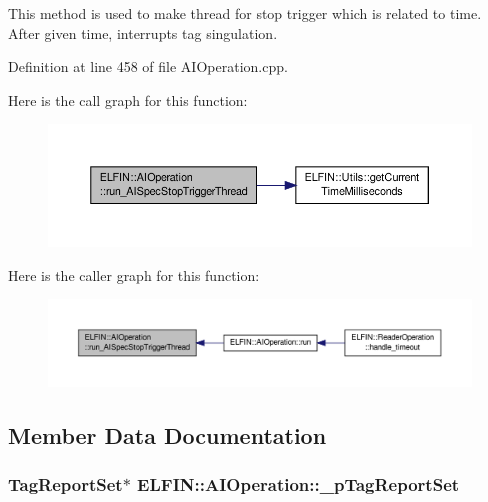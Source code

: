 This method is used to make thread for stop trigger which is related to time. After given time, interrupts tag singulation. 



Definition at line 458 of file A\-I\-Operation.\-cpp.



Here is the call graph for this function\-:
\nopagebreak
\begin{figure}[H]
\begin{center}
\leavevmode
\includegraphics[width=350pt]{class_e_l_f_i_n_1_1_a_i_operation_a8cc8f6baacabcddac43853a5f72fa580_cgraph}
\end{center}
\end{figure}




Here is the caller graph for this function\-:
\nopagebreak
\begin{figure}[H]
\begin{center}
\leavevmode
\includegraphics[width=350pt]{class_e_l_f_i_n_1_1_a_i_operation_a8cc8f6baacabcddac43853a5f72fa580_icgraph}
\end{center}
\end{figure}




\subsection{Member Data Documentation}
\hypertarget{class_e_l_f_i_n_1_1_a_i_operation_a565a8b3215c53586eaaf56a91e62a4bd}{
\subsubsection[{\-\_\-p\-Tag\-Report\-Set}]{\setlength{\rightskip}{0pt plus 5cm}Tag\-Report\-Set$\ast$ E\-L\-F\-I\-N\-::\-A\-I\-Operation\-::\-\_\-p\-Tag\-Report\-Set\hspace{0.3cm}{\ttfamily [private]}}}\label{class_e_l_f_i_n_1_1_a_i_operation_a565a8b3215c53586eaaf56a91e62a4bd}


